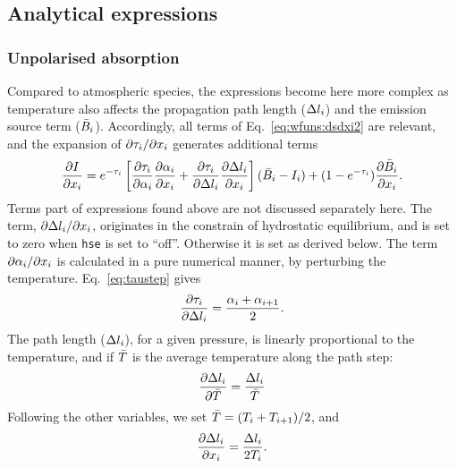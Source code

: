 \subsection{Analytical expressions}
%
\subsubsection{Unpolarised absorption}
%
Compared to atmospheric species, the expressions become here more complex as
temperature also affects the propagation path length ($\Delta l_{i}$)
and the emission source term ($\bar{B}_i$). Accordingly, all terms of
Eq.~\ref{eq:wfuns:dsdxi2} are relevant, and the expansion of
$\partial\tau_{i}/\partial x_{i}$ generates additional terms
\begin{equation}
  \frac{\partial I}{\partial x_{i}} =
   e^{-\tau_{i}}\left[
      \frac{\partial\tau_{i}}{\partial{\alpha}_{i}}
      \frac{\partial{\alpha}_{i}}{\partial x_{i}} + 
      \frac{\partial\tau_{i}}{\partial\Delta l_{i}}
     \frac{\partial\Delta l_{i}}{\partial x_{i}}
  \right](\bar{B}_i-I_{i})+
  (1-e^{-\tau_{i}})\frac{\partial\bar{B}_i}{\partial x_{i}}.  
\end{equation}
Terms part of expressions found above are not discussed separately here. The
term, $\partial\Delta l_{i}/\partial x_{i}$, originates in the
constrain of hydrostatic equilibrium, and is set to zero when \verb|hse| 
is set to ``off''. Otherwise it is set as derived below.
The term $\partial{\alpha}_{i}/\partial x_{i}$ is calculated in a pure
numerical manner, by perturbing the temperature. Eq.~\ref{eq:taustep} gives
\begin{equation}
  \frac{\partial \tau_{i}}{\partial \Delta l_{i}} = 
  \frac{{\alpha}_{i}+{\alpha}_{i+1}}{2}. 
\end{equation}
The path length ($\Delta l_{i}$), for a given pressure, is linearly
proportional to the temperature, and if $\bar{T}$ is the average temperature
along the path step:
\begin{equation}
  \frac{\partial \Delta l_{i}}{\partial \bar{T}} =   
                                    \frac{\Delta l_{i}}{\bar{T}} 
\end{equation}
Following the other variables, we set $\bar{T}=(T_{i}+T_{i+1})/2$, and
\begin{equation}
  \frac{\partial \Delta l_{i}}{\partial x_{i}} = 
                                    \frac{\Delta l_{i}}{2T_{i}}.
\end{equation}
